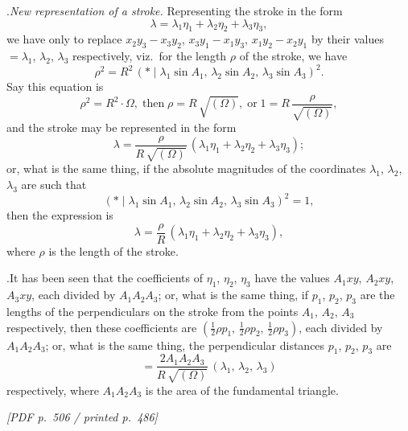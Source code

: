 \documentclass[11pt]{article}
\begin{document}
\medskip

.\quad \textit{New representation of a stroke.} Representing the stroke in the form
\[
\lambda = \lambda_{1}\eta_{1} + \lambda_{2}\eta_{2} + \lambda_{3}\eta_{3},
\]
we have only to replace $x_{2}y_{3} - x_{3}y_{2}$, $x_{3}y_{1} - x_{1}y_{3}$, $x_{1}y_{2} - x_{2}y_{1}$ by their values $= \lambda_{1}$, $\lambda_{2}$, $\lambda_{3}$ respectively, viz.\ for the length $\rho$ of the stroke, we have
\[
\rho^{2} = R^{2}\,(*\!\mid\lambda_{1}\sin A_{1},\,\lambda_{2}\sin A_{2},\,\lambda_{3}\sin A_{3})^{2}.
\]
Say this equation is
\[
\rho^{2} = R^{2}\cdot\Omega,\;\text{then}\;\rho = R\,\sqrt{(\Omega)},\;\text{or}\;1 = R\,\frac{\rho}{\sqrt{(\Omega)}},
\]
and the stroke may be represented in the form
\[
\lambda = \frac{\rho}{R\,\sqrt{(\Omega)}}\,(\lambda_{1}\eta_{1} + \lambda_{2}\eta_{2} + \lambda_{3}\eta_{3});
\]
or, what is the same thing, if the absolute magnitudes of the coordinates $\lambda_{1}$, $\lambda_{2}$, $\lambda_{3}$ are such that
\[
(*\!\mid\lambda_{1}\sin A_{1},\,\lambda_{2}\sin A_{2},\,\lambda_{3}\sin A_{3})^{2} = 1,
\]
then the expression is
\[
\lambda = \frac{\rho}{R}\,(\lambda_{1}\eta_{1} + \lambda_{2}\eta_{2} + \lambda_{3}\eta_{3}),
\]
where $\rho$ is the length of the stroke.

\medskip

.\quad It has been seen that the coefficients of $\eta_{1}$, $\eta_{2}$, $\eta_{3}$ have the values $A_{1}xy$, $A_{2}xy$, $A_{3}xy$, each divided by $A_{1}A_{2}A_{3}$; or, what is the same thing, if $p_{1}$, $p_{2}$, $p_{3}$ are the lengths of the perpendiculars on the stroke from the points $A_{1}$, $A_{2}$, $A_{3}$ respectively, then these coefficients are $(\tfrac{1}{2}\rho p_{1},\,\tfrac{1}{2}\rho p_{2},\,\tfrac{1}{2}\rho p_{3})$, each divided by $A_{1}A_{2}A_{3}$; or, what is the same thing, the perpendicular distances $p_{1}$, $p_{2}$, $p_{3}$ are
\[
= \frac{2A_{1}A_{2}A_{3}}{R\,\sqrt{(\Omega)}}\,(\lambda_{1},\,\lambda_{2},\,\lambda_{3})
\]
respectively, where $A_{1}A_{2}A_{3}$ is the area of the fundamental triangle.

\vfill
\noindent\textit{[PDF p.~506 / printed p.~486]}
\newpage
\end{document}

